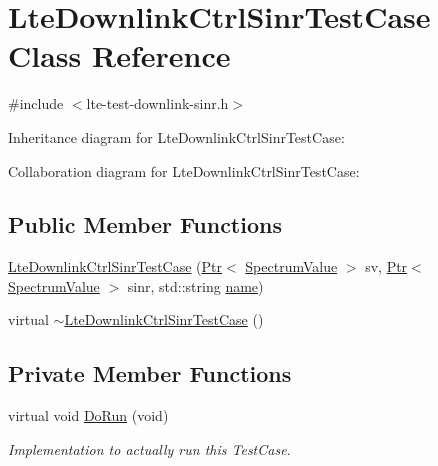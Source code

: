 \hypertarget{classLteDownlinkCtrlSinrTestCase}{}\section{Lte\+Downlink\+Ctrl\+Sinr\+Test\+Case Class Reference}
\label{classLteDownlinkCtrlSinrTestCase}


{\ttfamily \#include $<$lte-\/test-\/downlink-\/sinr.\+h$>$}



Inheritance diagram for Lte\+Downlink\+Ctrl\+Sinr\+Test\+Case\+:


Collaboration diagram for Lte\+Downlink\+Ctrl\+Sinr\+Test\+Case\+:
\subsection*{Public Member Functions}
\begin{DoxyCompactItemize}
\item 
\hyperlink{classLteDownlinkCtrlSinrTestCase_a54a87d58d52f40bf22709da6ea3a4e80}{Lte\+Downlink\+Ctrl\+Sinr\+Test\+Case} (\hyperlink{classns3_1_1Ptr}{Ptr}$<$ \hyperlink{classns3_1_1SpectrumValue}{Spectrum\+Value} $>$ sv, \hyperlink{classns3_1_1Ptr}{Ptr}$<$ \hyperlink{classns3_1_1SpectrumValue}{Spectrum\+Value} $>$ sinr, std\+::string \hyperlink{generate__test__data__lte__spectrum__model_8m_ab74e6bf80237ddc4109968cedc58c151}{name})
\item 
virtual \hyperlink{classLteDownlinkCtrlSinrTestCase_a95fbf76be131012becbbca1b468fb9cf}{$\sim$\+Lte\+Downlink\+Ctrl\+Sinr\+Test\+Case} ()
\end{DoxyCompactItemize}
\subsection*{Private Member Functions}
\begin{DoxyCompactItemize}
\item 
virtual void \hyperlink{classLteDownlinkCtrlSinrTestCase_a1ed9e568c8d110c158f468dad32fe9ff}{Do\+Run} (void)
\begin{DoxyCompactList}\small\item\em Implementation to actually run this Test\+Case. \end{DoxyCompactList}\end{DoxyCompactItemize}

